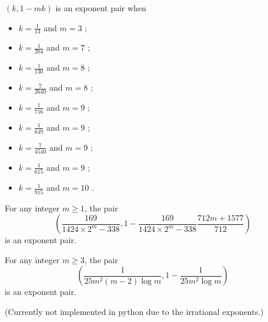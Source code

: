 \literature
{}

\begin{theorem}\label{exp_pair_deriv_test} $(k,1-mk)$ is an exponent pair when
    \begin{itemize}
\item[(i)] $k=\frac{1}{13}$ and $m=3$ \cite[Theorem 1]{robert_fourth_2002};
\item[(ii)] $k = \frac{1}{204}$ and $m=7$ \cite[p. 231]{sargos_analog_2003};
\item[(iii)] $k = \frac{1}{130}$ and $m=8$ \cite[(1.1)]{robert_2002};
\item[(iv)] $k = \frac{7}{2640}$ and $m=8$ \cite[p. 231]{sargos_analog_2003};
\item[(v)] $k = \frac{1}{716}$ and $m=9$ \cite[p. 231]{sargos_analog_2003};
\item[(vi)] $k = \frac{1}{649}$ and $m=9$ \cite{Robert_Sargos_2001};
\item[(vii)] $k = \frac{7}{4540}$ and $m=9$ \cite[(1.2)]{robert_2002};
\item[(viii)] $k = \frac{1}{615}$ and $m=9$ \cite[(1.1)]{robert_2002};
\item[(ix)] $k = \frac{1}{915}$ and $m=10$ \cite[Th\'eor\`eme 2]{robert_2002b}.
\end{itemize}
\end{theorem}

\literature
{}


\begin{theorem}\label{huxley_exp_pair}\cite[Table 17.3]{huxley_area_1996}  For any integer $m \geq 1$, the pair
    $$ \left(\frac{169}{1424 \times 2^m - 338}, 1 - \frac{169}{1424 \times 2^m - 338} \frac{712m+1577}{712}\right)$$
is an exponent pair.
\end{theorem}

\literature
{}

\begin{theorem}\label{heath-brown_exp_pair_1996}\cite[(6.17.4)]{titchmarsh_theory_1986}  For any integer $m \geq 3$, the pair
$$ \left(\frac{1}{25m^2 (m-2) \log m}, 1 - \frac{1}{25 m^2\log m}\right)$$
is an exponent pair.
\end{theorem}

(Currently not implemented in python due to the irrational exponents.)

